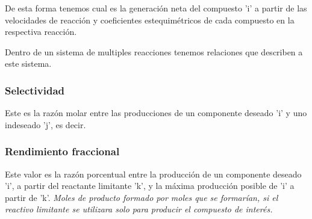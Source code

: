 
De esta forma tenemos cual es la generación neta del compuesto 'i' a partir de las velocidades de reacción y coeficientes estequimétricos de cada compuesto en la respectiva reacción.

Dentro de un sistema de multiples reacciones tenemos relaciones que describen a este sistema.


\subsubsection{Selectividad}


Este es la razón molar entre las producciones de un componente deseado 'i' y uno indeseado 'j', es decir.


\subsubsection{Rendimiento fraccional}

Este valor es la razón porcentual entre la producción de un componente deseado 'i', a partir del reactante limitante 'k', y la máxima producción posible de 'i' a partir de 'k'.
\textit{Moles de producto formado por moles que se formarían, si el reactivo limitante se utilizara solo para producir el compuesto de interés.}


